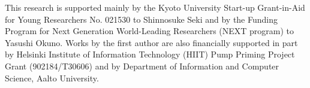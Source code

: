 \documentclass{article}
\theoremstyle{remark}
\theoremstyle{definition}
\begin{document}
This research is supported mainly by the Kyoto University Start-up Grant-in-Aid for Young Researchers No. 021530 to Shinnosuke Seki and by the Funding Program for Next Generation World-Leading Researchers (NEXT program) to Yasushi Okuno. 
Works by the first author are also financially supported in part by Helsinki Institute of Information Technology (HIIT) Pump Priming Project Grant (902184/T30606) and by Department of Information and Computer Science, Aalto University. 

	
	
\end{document}
